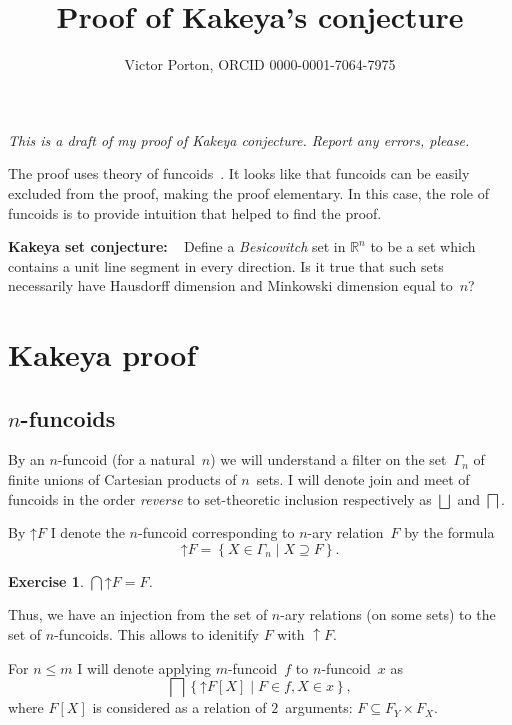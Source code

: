 \documentclass{amsart}
\title{Proof of Kakeya's conjecture}
\author{Victor Porton, ORCID 0000-0001-7064-7975}
\newcommand{\setcond}[2]{\left\{#1\mid#2\right\}}
\newtheorem{exer}{Exercise}
\begin{document}
\maketitle  

\emph{This is a draft of my proof of Kakeya conjecture. Report any errors, please.}

The proof uses theory of funcoids~\cite{volume-1}. It looks like that funcoids can be easily excluded from the proof, making the proof elementary. In this case, the role of funcoids is to provide intuition that helped to find the proof.

\textbf{Kakeya set conjecture:} \cite{kakeya-long}~\cite{tao-blog-kakeya} Define a \emph{Besicovitch} set in $\mathbb{R}^n$ to be a set which contains a unit line segment in every direction. Is it true that such sets necessarily have Hausdorff dimension and Minkowski dimension equal to~$n$?

\section{Kakeya proof}

\subsection{$n$-fun\-co\-ids}

By an $n$-fun\-co\-id (for a natural~$n$) we will understand a filter on the set~$\Gamma_n$ of finite unions of Cartesian products of $n$~sets. I will denote join and meet of funcoids in the order \emph{reverse} to set-the\-o\-re\-tic inclusion respectively as $\bigsqcup$ and $\bigsqcap$.

By $\mathord{\uparrow}F$ I denote the $n$-fun\-co\-id corresponding to $n$-ary relation~$F$ by the formula
\[ \mathord{\uparrow}F = \setcond{X\in\Gamma_n}{X\supseteq F}. \]

\begin{exer}
$\bigcap\mathord{\uparrow}F = F$.
\end{exer}

Thus, we have an injection from the set of $n$-ary relations (on some sets) to the set of $n$-fun\-co\-ids.
This allows to idenitify $F$ with $\uparrow F$.

For $n\leq m$ I will denote applying $m$-fun\-co\-id~$f$ to $n$-fun\-co\-id~$x$ as
\[ \bigsqcap\setcond{\mathord{\uparrow} F[X]}{F\in f,X\in x}, \]
where $F[X]$ is considered as a relation of $2$~arguments: $F\subseteq F_Y\times F_X$.
\end{document}

